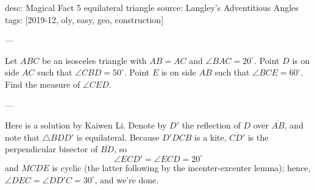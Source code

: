 desc: Magical Fact 5 equilateral triangle
source: Langley's Adventitious Angles
tags: [2019-12, oly, easy, geo, construction]

---

Let $ABC$ be an isosceles triangle with $AB=AC$ and $\angle BAC=20^\circ$. Point $D$ is on side $AC$ such that $\angle CBD=50^\circ$. Point $E$ is on side $AB$ such that $\angle BCE=60^\circ$. Find the measure of $\angle CED$.

---

Here is a solution by Kaiwen Li. Denote by $D'$ the reflection of $D$ over $\overline{AB}$, and note that $\triangle BDD'$ is equilateral. Because $D'DCB$ is a kite, $\overline{CD'}$ is the perpendicular bisector of $\overline{BD}$, so \[\angle ECD'=\angle ECD=20^\circ\]
and $MCDE$ is cyclic (the latter following by the incenter-excenter lemma); hence, $\angle DEC=\angle DD'C=30^\circ$, and we're done.
